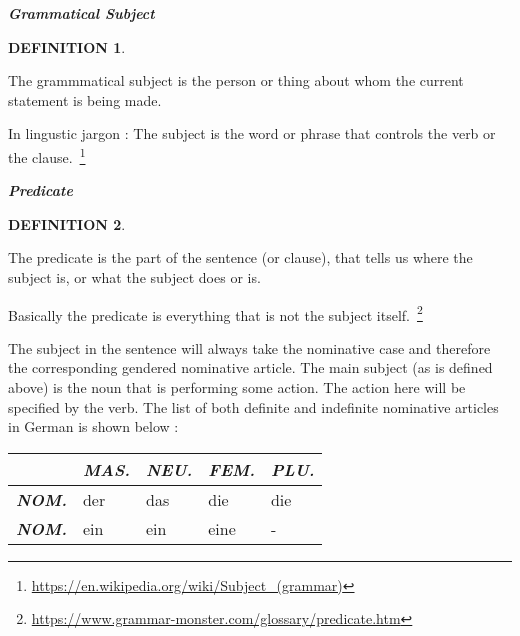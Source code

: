 \documentclass[a4paper,twocolumn,10pt]{article}
\newtheorem{mydef}{DEFINITION}[section]
\newcommand{\newpar}
{\par \vspace{0.3cm}}
\newcommand{\tcolorboxstart}
{
	\nolinenumbers
	\vspace{0.2cm}
	\centering
}
\newcommand{\tcolorboxend}
{
	\justifying
	\vspace{0.2cm}
	\linenumbers
}
\newcommand{\tcolorboxdefinition}[3]
{

\tcolorboxstart
\begin{defn-bg}

	\begin{defn-title}[width=7cm]{}
	{
		\normalsize \textbf{\textit{#1}}
	}
	\end{defn-title}

	\begin{defn-theword}
	{
		\footnotesize
		\begin{mydef} #2
		\end{mydef}
	}
	\end{defn-theword}


	\begin{defn-content}

	\justify
	#3

	\end{defn-content}

\end{defn-bg}
\tcolorboxend
}
\begin{document}

\tcolorboxdefinition
{Grammatical Subject}
{\label{def:grammatical_subject}}
{
The grammmatical subject is the person or thing about whom the current statement
is being made.\newpar

In lingustic jargon : The subject is the word or phrase that controls the
verb or the clause.~\footnote{\url{https://en.wikipedia.org/wiki/Subject\_(grammar)}}

}



\tcolorboxdefinition
{Predicate}
{\label{def:predicate}}
{

The predicate is the part of the sentence (or clause), that tells us where the
subject is, or what the subject does or is.\newpar

Basically the predicate is everything that is not the subject
itself.~\footnote{\url{https://www.grammar-monster.com/glossary/predicate.htm}}

}



 The subject in the sentence will always take the nominative case and therefore
 the corresponding gendered nominative article. The main subject (as is defined
 above) is the noun that is performing some action. The action here will be
 specified by the verb. The list of both definite and indefinite nominative
 articles in German is shown below :\newpar


\nolinenumbers

\vspace{0.5cm}

\begin{tabularx}{0.94\linewidth}{l|XXXX}

		&
		\cellcolor{table-subtopic} \textbf{\textit{MAS.}} &
		\cellcolor{table-subtopic} \textbf{\textit{NEU.}}  &
		\cellcolor{table-subtopic} \textbf{\textit{FEM.}}  &
		\cellcolor{table-subtopic} \textbf{\textit{PLU.}} \\
		\midrule

		\cellcolor{table-subtopic} \textbf{\textit{NOM.}} &
		\cellcolor{cell-lightpurple}  der            &
		\cellcolor{cell-lightorange}  das            &
		\cellcolor{cell-lightblue} die               &
		\cellcolor{cell-lightblue} die \\

		\midrule

		\cellcolor{table-subtopic} \textbf{\textit{NOM.}} &
		\cellcolor{cell-lightpurple}  ein            &
		\cellcolor{cell-lightorange}  ein            &
		\cellcolor{cell-lightblue} eine              &
		\cellcolor{table-bg} - \\

\end{tabularx}
\end{document}
